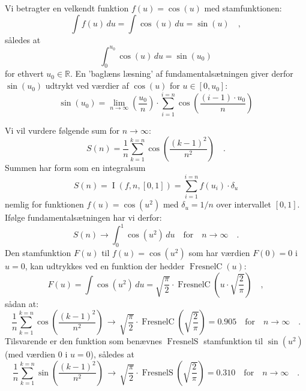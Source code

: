 \begin{example} \label{exampSinusSum}
Vi betragter en velkendt funktion  $f(u)= \cos(u)$ med stamfunktionen:
\begin{equation}
\int f(u) \, du  = \int \cos(u) \, du = \sin(u) \quad ,
\end{equation}
således at
\begin{equation}
\int_{0}^{u_{0}} \cos(u) \, du  =  \sin(u_{0})
\end{equation}
for ethvert  $u_{0} \in \mathbb{R}$.
En 'baglæns læsning' af fundamentalsætningen giver derfor  $\sin(u_{0})$ udtrykt ved
værdier af $\cos(u)$ for $u \in [0, u_{0}]$:
\begin{equation}
\sin(u_{0}) = \lim_{n \to \infty} \left(\frac{u_{0}}{n}\right) \cdot \sum_{i=1}^{i=n} \cos\left( \frac{(i-1)\cdot u_{0}}{n}\right)
\end{equation}
\end{example}

\begin{example} \label{exampFresnelC}
Vi vil vurdere følgende sum for $n \to \infty$:
\begin{equation}
S(n) = \frac{1}{n}\sum_{k=1}^{k=n} \cos\left(\frac{(k-1)^{2}}{n^{2}}\right) \quad .
\end{equation}
Summen har form som en integralsum
\begin{equation}
S(n) = \operatorname{I}(f, n, [0, 1]) = \sum_{i=1}^{i=n} f(u_{i}) \cdot \delta_{u}
\end{equation}
nemlig for funktionen $f(u) = \cos(u^{2})$ med $\delta_{u} = 1/n$ over intervallet $[0, 1]$.
Ifølge fundamentalsætningen har vi derfor:
\begin{equation}
S(n) \to \int_{0}^{1} \cos(u^{2}) \, du  \quad \textrm{for} \quad n \to \infty \quad.
\end{equation}
Den stamfunktion $F(u)$ til $f(u) = \cos(u^{2})$ som har værdien $F(0) = 0 $ i $u=0$, kan udtrykkes ved en funktion der hedder
$\operatorname{FresnelC}(u)$:
\begin{equation}
F(u) = \int \cos(u^{2}) \, du  = \sqrt{\frac{\pi}{2}}\cdot\operatorname{FresnelC}\left(u\cdot\sqrt{\frac{2}{\pi}} \right) \quad ,
\end{equation}
sådan at:
\begin{equation}
\frac{1}{n}\sum_{k=1}^{k=n} \cos\left(\frac{(k-1)^{2}}{n^{2}}\right) \, \to \,\sqrt{\frac{\pi}{2}}\cdot \operatorname{FresnelC}\left(\sqrt{\frac{2}{\pi}}\right) = 0.905 \quad \textrm{for} \quad n \to \infty \quad.
\end{equation}
Tilsvarende er den funktion som benævnes $\operatorname{FresnelS}$ stamfunktion til $\sin(u^{2})$ (med værdien $0$ i $u=0$), således at
\begin{equation}
\frac{1}{n}\sum_{k=1}^{k=n} \sin\left(\frac{(k-1)^{2}}{n^{2}}\right) \, \to \,\sqrt{\frac{\pi}{2}}\cdot \operatorname{FresnelS}\left(\sqrt{\frac{2}{\pi}}\right) = 0.310 \quad \textrm{for} \quad n \to \infty \quad.
\end{equation}
\end{example}





